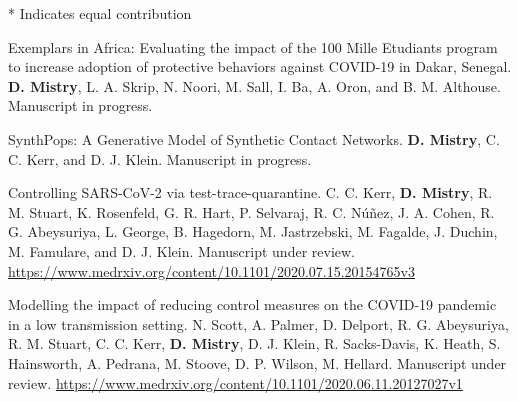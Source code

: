 \begin{cventries}

* Indicates equal contribution

  \cvpublicationentry
    {Exemplars in Africa: Evaluating the impact of the 100 Mille Etudiants program to increase adoption of protective behaviors against COVID-19 in Dakar, Senegal.} %
    {\textbf{D. Mistry}, L. A. Skrip, N. Noori, M. Sall, I. Ba, A. Oron, and B. M. Althouse.} %
    {} %
    {} %
    {} %
    {} %
    {} %
    {Manuscript in progress.} %
    {} %
    \vspace{1.5mm}

  \cvpublicationentry
    {SynthPops: A Generative Model of Synthetic Contact Networks.} %
    {\textbf{D. Mistry}, C. C. Kerr, and D. J. Klein.} %
    {} %
    {} %
    {} %
    {} %
    {} %
    {Manuscript in progress.} %
    {} %
    \vspace{1.5mm}

  \cvpublicationentry
    {Controlling SARS-CoV-2 via test-trace-quarantine.} %
    {C. C. Kerr, \textbf{D. Mistry},  R. M. Stuart, K. Rosenfeld, G. R. Hart, P. Selvaraj, R. C. N\'{u}\~{n}ez, J. A. Cohen, R. G. Abeysuriya, L. George, B. Hagedorn, M. Jastrzebski, M. Fagalde, J. Duchin, M. Famulare, and D. J. Klein.} %
    {} %
    {} %
    {} %
    {} %
    {} %
    {Manuscript under review.} %
    {\href{https://www.medrxiv.org/content/10.1101/2020.07.15.20154765v3}{https://www.medrxiv.org/content/10.1101/2020.07.15.20154765v3}} %
    \vspace{1.5mm}


  \cvpublicationentry
    {Modelling the impact of reducing control measures on the COVID-19 pandemic in a low transmission setting.} %
    {N. Scott, A. Palmer, D. Delport, R. G. Abeysuriya, R. M. Stuart, C. C. Kerr, \textbf{D. Mistry}, D. J. Klein, R. Sacks-Davis, K. Heath, S. Hainsworth, A. Pedrana, M. Stoove, D. P. Wilson, M. Hellard.} %
    {} %
    {} %
    {} %
    {} %
    {} %
    {Manuscript under review.} %
    {\href{https://www.medrxiv.org/content/10.1101/2020.06.11.20127027v1}{https://www.medrxiv.org/content/10.1101/2020.06.11.20127027v1}} %
    \vspace{1.5mm}


\end{cventries}
